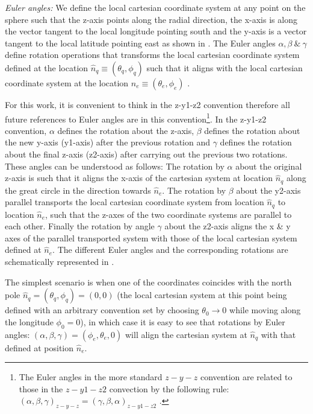 \textit{Euler angles:}  We define the local cartesian coordinate system at any point on the sphere such that the z-axis points along the radial direction, the x-axis is along the vector tangent to the local longitude pointing south and the y-axis is a vector tangent to the local latitude pointing east as shown in . The Euler angles $\alpha ,\beta ~\&~ \gamma$ define rotation operations that transforms the local cartesian coordinate system defined at the location $\hat{n}_q \equiv (\theta_q,\phi_q)$ such that it aligns with the local cartesian coordinate system at the location $\hat{n}_e \equiv (\theta_e,\phi_e)$ \cite{varshalovich}. 

For this work, it is convenient to think in the z-y1-z2 convention therefore all future references to Euler angles are in this convention\footnote{The Euler angles in the more standard $z-y-z$ convention are related to those in the $z-y1-z2$ convection by the following rule: $(\alpha,\beta,\gamma)_{z-y-z} =(\gamma,\beta,\alpha)_{z-y1-z2}$ \cite{varshalovich}.}.
In the z-y1-z2 convention, $\alpha$ defines the rotation about the z-axis, $\beta$ defines the rotation about the new y-axis (y1-axis) after the previous rotation and $\gamma$ defines the rotation about the final z-axis (z2-axis) after carrying out the previous two rotations. These angles can be understood as follows: The rotation by $\alpha$ about the original z-axis is such that it aligns the x-axis of the cartesian system at location $\hat{n}_q$ along the great circle in the direction  towards $\hat{n}_e$.  The rotation by $\beta$ about the y2-axis parallel transports the local cartesian coordinate system from location $\hat{n}_q$ to location $\hat{n}_e$, such that the z-axes of the two coordinate systems are parallel to each other. Finally the rotation by angle $\gamma$ about the z2-axis aligns the x \& y axes of the parallel transported system with those of the local cartesian system defined at $\hat{n}_e$. The different Euler angles and the corresponding rotations are schematically represented in .

The simplest scenario is when one of the coordinates coincides with the north pole $\hat{n}_q=(\theta_q,\phi_q)=(0,0)$ (the local cartesian system at this point being defined with an arbitrary convention set by choosing $\theta_0 \rightarrow 0$ while moving along the longitude $\phi_0=0$), in which case it is easy to see that rotations by Euler angles: $(\alpha,\beta,\gamma) =(\phi_e,\theta_e,0)$ will align the cartesian system at $\hat{n}_q$ with that defined at position $\hat{n}_e$. 

